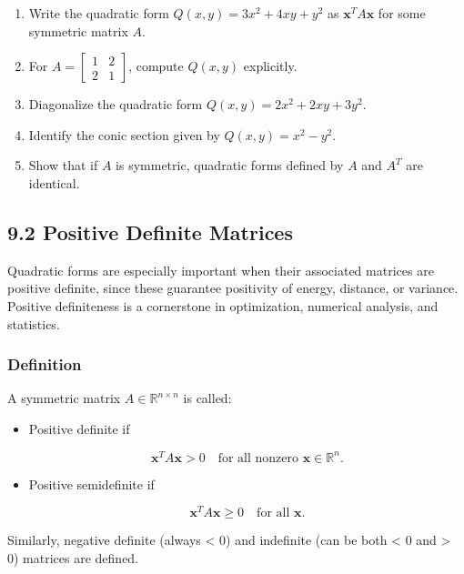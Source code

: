 \documentclass[
  12pt,
  a4paper,
]{article}
\begin{document}
\begin{enumerate}
\def\labelenumi{\arabic{enumi}.}
\item
  Write the quadratic form \(Q(x,y) = 3x^2 + 4xy + y^2\) as
  \(\mathbf{x}^T A \mathbf{x}\) for some symmetric matrix \(A\).
\item
  For \(A = \begin{bmatrix} 1 & 2 \\ 2 & 1 \end{bmatrix}\), compute
  \(Q(x,y)\) explicitly.
\item
  Diagonalize the quadratic form \(Q(x,y) = 2x^2 + 2xy + 3y^2\).
\item
  Identify the conic section given by \(Q(x,y) = x^2 - y^2\).
\item
  Show that if \(A\) is symmetric, quadratic forms defined by \(A\) and
  \(A^T\) are identical.
\end{enumerate}

\subsection{9.2 Positive Definite
Matrices}\label{92-positive-definite-matrices}

Quadratic forms are especially important when their associated matrices
are positive definite, since these guarantee positivity of energy,
distance, or variance. Positive definiteness is a cornerstone in
optimization, numerical analysis, and statistics.

\subsubsection{Definition}\label{definition-9}

A symmetric matrix \(A \in \mathbb{R}^{n \times n}\) is called:

\begin{itemize}
\item
  Positive definite if

  \[\mathbf{x}^T A \mathbf{x} > 0 \quad \text{for all nonzero } \mathbf{x} \in \mathbb{R}^n.\]
\item
  Positive semidefinite if

  \[\mathbf{x}^T A \mathbf{x} \geq 0 \quad \text{for all } \mathbf{x}.\]
\end{itemize}

Similarly, negative definite (always \textless{} 0) and indefinite (can
be both \textless{} 0 and \textgreater{} 0) matrices are defined.
\end{document}

